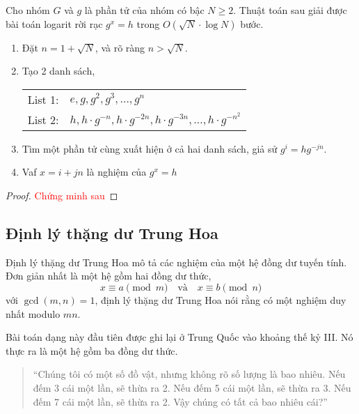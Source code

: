 \begin{proposition}
	Cho nhóm $G$ và $g$ là phần tử của nhóm có bậc $N \geq 2$. Thuật toán sau giải được bài toán logarit rời rạc $g^x=h$ trong $O(\sqrt{N} \cdot \log N)$ bước.

	\begin{enumerate}
		\item Đặt $n = 1 + \sqrt{N}$, và rõ ràng $ n > \sqrt{N}$.
		\item Tạo 2 danh sách,

		      \begin{tabular}{rl}
			      \centering
			      List 1: & $e, g, g^2, g^3, \ldots , g^n$                                                   \\
			      List 2: & $h, h \cdot g^{-n}, h \cdot g^{-2n}, h \cdot g^{-3n}, \ldots , h \cdot g^{-n^2}$
		      \end{tabular}
		\item Tìm một phần tử cùng xuất hiện ở cả hai danh sách, giả sử $g^i = hg^{-jn}.$
		\item Vaf $x = i + jn$ là nghiệm của $g^x = h$
	\end{enumerate}
\end{proposition}

\begin{proof}
	\textcolor{red}{Chứng minh sau}
\end{proof}

\subsection{Định lý thặng dư Trung Hoa}
Định lý thặng dư Trung Hoa mô tả các nghiệm của một hệ đồng dư tuyến tính.
Đơn giản nhất là một hệ gồm hai đồng dư thức,
\begin{equation}
	\label{eq:dual}
	x \equiv a \pmod{m} \quad \text{và} \quad x \equiv b \pmod{n}
\end{equation}
với $\gcd(m, n) = 1$,  định lý thặng dư Trung Hoa nói rằng có một nghiệm duy
nhất modulo $mn$.

Bài toán dạng này đầu tiên được ghi lại ở Trung Quốc vào khoảng thế kỷ III. Nó thực ra là một hệ gồm ba đồng dư thức.
\begin{quotation}
	``Chúng tôi có một số đồ vật, nhưng không rõ số lượng là bao nhiêu.
	Nếu đếm 3 cái một lần, sẽ thừa ra 2.
	Nếu đếm 5 cái một lần, sẽ thừa ra 3.
	Nếu đếm 7 cái một lần, sẽ thừa ra 2.
	Vậy chúng có tất cả bao nhiêu cái?''
\end{quotation}

